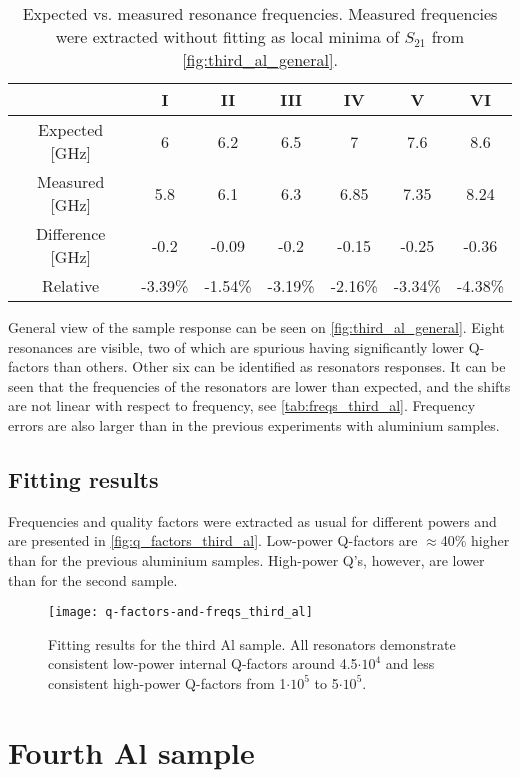 \documentclass[12pt]{article}
\numberwithin{equation}{section}
\numberwithin{figure}{section}
\begin{document}
\begin{table}[h]
\centering
\bgroup
\def\arraystretch{1.5}%
\begin{tabular}{c|*{6}{c}}
  & I & II & III & IV & V & VI\\
\hline
Expected [GHz]& 6 & 6.2 & 6.5 & 7 & 7.6 & 8.6 \\
Measured [GHz] & 5.8 &  6.1 & 6.3 & 6.85 &  7.35 &  8.24 \\
Difference [GHz]&  -0.2 & -0.09& -0.2 & -0.15& -0.25& -0.36 \\
Relative & -3.39\%& -1.54\%& -3.19\%& -2.16\%& -3.34\%& -4.38\%
\end{tabular}
\egroup
\caption{Expected vs. measured resonance frequencies. Measured frequencies were extracted without fitting as local minima of $S_{21}$ from \autoref{fig:third_al_general}.}
\label{tab:freqs_third_al}
\end{table}

General view of the sample response can be seen on \autoref{fig:third_al_general}. Eight resonances are visible, two of which are spurious having significantly lower Q-factors than others. Other six can be identified as resonators responses. It can be seen that the frequencies of the resonators are lower than expected, and the shifts are not linear with respect to frequency, see \autoref{tab:freqs_third_al}. Frequency errors are also larger than in the previous experiments with aluminium samples.


\subsection{Fitting results}

Frequencies and quality factors were extracted as usual for different powers and are presented in \autoref{fig:q_factors_third_al}. Low-power Q-factors are $\approx$40\% higher than for the previous aluminium samples. High-power Q's, however, are lower than for the second sample. 

\begin{figure}[h]
\centering
\texttt{[image: q-factors-and-freqs\_third\_al]}
\caption{Fitting results for the third Al sample. All resonators demonstrate consistent low-power internal Q-factors around 4.5$\cdot 10^4$ and less consistent high-power Q-factors from 1$\cdot 10^5$ to 5$\cdot 10^5$.}
\label{fig:q_factors_third_al}
\end{figure}

\section{Fourth Al sample}
\end{document}
